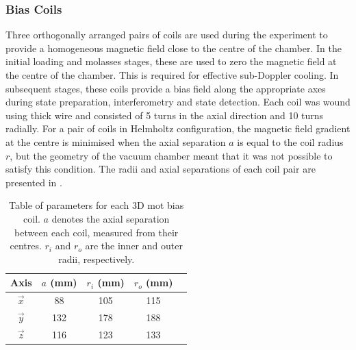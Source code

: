 \subsubsection{Bias Coils}
Three orthogonally arranged pairs of coils are used during the
experiment to provide a homogeneous magnetic field close to the centre of the chamber. In the initial loading and molasses stages, these are used to zero the magnetic field at the centre of the chamber. This is required for effective sub-Doppler cooling. In subsequent stages,
these coils provide a bias field along the appropriate axes during state
preparation, interferometry and state detection. Each coil was wound using
 thick wire and consisted of 5 turns in the
axial direction and 10 turns radially. For a pair of coils in Helmholtz configuration, the magnetic field
gradient at the centre is minimised when the axial separation \(a\) is equal to
the coil radius \(r\), but the geometry of the vacuum chamber meant that it was
not possible to satisfy this condition. The radii and axial separations of each
coil pair are presented in .\begin{table}
	\begin{tabular}{ccccc}
		\toprule
		Axis        & \(a\) (mm) & \(r_i\) (mm) & \(r_o\) (mm) \\
		\midrule
		\(\vec{x}\) & 88         & 105          & 115          \\
		\(\vec{y}\) & 132        & 178          & 188          \\
		\(\vec{z}\) & 116        & 123          & 133          \\
		\bottomrule
	\end{tabular}
	\caption[Table of parameters for each 3D \ac{mot} bias coil.]{Table of
		parameters for each 3D \ac{mot} bias coil. \(a\) denotes the axial
		separation between each coil, measured from their centres. \(r_i\) and \(r_o\) are the inner and
		outer radii, respectively.}
	\label{tab:bias_coils}
\end{table}
